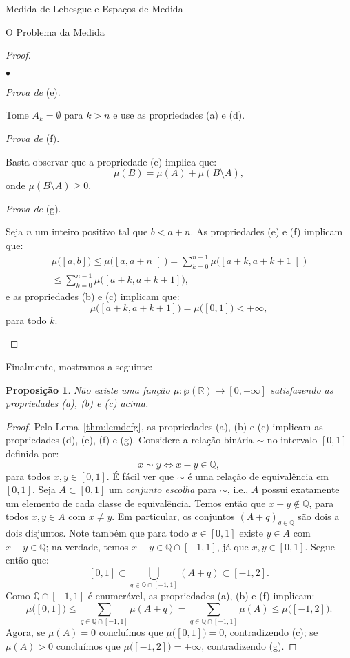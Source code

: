 \documentclass[oneside,final,11pt]{amsbook}
\newcommand{\R}{\mathds R}
\newcommand{\Q}{\mathds Q}
\newcounter{contador}
\newenvironment{bulletindent}{\setcounter{contador}{0}
\begin{list} {$\bullet$}
{\usecounter{contador}
\setlength{\leftmargin}{10pt}
\setlength{\rightmargin}{10pt}
\setlength{\labelsep}{5pt}
\setlength{\itemsep}{10pt}
\setlength{\topsep}{10pt}}}
{\end{list}}
\theoremstyle{remark}\newtheorem{exercise}{Exercício}[chapter]
\theoremstyle{remark}\newtheorem{*exercise}[exercise]{\hbox to 0pt{\hskip 0pt minus 1fil*}Exercício}
\theoremstyle{definition}\newtheorem{exdefin}{Definição}[chapter]
\theoremstyle{plain}\newtheorem{teo}{Teorema}[section]
\theoremstyle{plain}\newtheorem{lem}[teo]{Lema}
\theoremstyle{plain}\newtheorem{prop}[teo]{Proposição}
\theoremstyle{plain}\newtheorem{cor}[teo]{Corolário}
\theoremstyle{definition}\newtheorem{defin}[teo]{Definição}
\theoremstyle{remark}\newtheorem{rem}[teo]{Observação}
\theoremstyle{definition}\newtheorem{notation}[teo]{Notação}
\theoremstyle{definition}\newtheorem{convention}[teo]{Convenção}
\theoremstyle{definition}\newtheorem{example}[teo]{Exemplo}
\numberwithin{section}{chapter}
\numberwithin{equation}{section}
\begin{document}
\begin{chapter}{Medida de Lebesgue e Espaços de Medida}
\begin{section}{O Problema da Medida}
\begin{proof}
\begin{bulletindent}
\item {\em Prova de\/} (e).

Tome $A_k=\emptyset$ para $k>n$ e use as propriedades (a) e (d).

\item {\em Prova de\/} (f).

Basta observar que a propriedade (e) implica que:
\[\mu(B)=\mu(A)+\mu(B\setminus A),\]
onde $\mu(B\setminus A)\ge0$.

\item {\em Prova de\/} (g).

Seja $n$ um inteiro positivo tal que $b<a+n$. As propriedades
(e) e (f) implicam que:
\begin{multline*}
\mu\big([a,b]\big)\le\mu\big(\left[a,a+n\right[\big)=\sum_{k=0}^{n-1}\mu\big(\left[a+k,a+k+1\right[\big)\\
\le\sum_{k=0}^{n-1}\mu\big([a+k,a+k+1]\big),
\end{multline*}
e as propriedades (b) e (c) implicam que:
\[\mu\big([a+k,a+k+1]\big)=\mu\big([0,1]\big)<+\infty,\]
para todo $k$.\qedhere
\end{bulletindent}
\end{proof}

Finalmente, mostramos a seguinte:
\begin{prop}\label{thm:naoexistemu}
Não existe uma função $\mu:\wp(\R)\to[0,+\infty]$ satisfazendo as propriedades (a), (b)
e (c) acima.
\end{prop}
\begin{proof}
Pelo Lema~\ref{thm:lemdefg}, as propriedades (a), (b) e (c) implicam as propriedades
(d), (e), (f) e (g).
Considere a relação binária $\sim$ no intervalo $[0,1]$ definida por:
\[x\sim y\Longleftrightarrow x-y\in\Q,\]
para todos $x,y\in[0,1]$. É fácil ver que $\sim$ é uma relação de equivalência
em $[0,1]$.
Seja $A\subset[0,1]$ um {\em conjunto escolha\/}
para $\sim$, i.e., $A$ possui exatamente um
elemento de cada classe de equivalência. Temos então que $x-y\not\in\Q$, para todos $x,y\in A$
com $x\ne y$. Em particular, os conjuntos $(A+q)_{q\in\Q}$ são dois a dois disjuntos.
Note também que para todo $x\in[0,1]$ existe $y\in A$ com $x-y\in\Q$; na verdade, temos
$x-y\in\Q\cap[-1,1]$, já que $x,y\in[0,1]$. Segue então que:
\[[0,1]\subset\!\!\!\!\!\!\!\bigcup_{q\in\Q\cap[-1,1]}\!\!\!\!(A+q)\subset[-1,2].\]
Como $\Q\cap[-1,1]$ é enumerável, as propriedades (a), (b) e (f) implicam:
\[\mu\big([0,1]\big)\le\!\!\!\!\!\!\sum_{q\in\Q\cap[-1,1]}\!\!\!\mu(A+q)
=\!\!\!\!\!\!\sum_{q\in\Q\cap[-1,1]}\!\!\!\mu(A)\le\mu\big([-1,2]\big).\]
Agora, se $\mu(A)=0$ concluímos que $\mu\big([0,1]\big)=0$, contradizendo (c);
se $\mu(A)>0$ concluímos que $\mu\big([-1,2]\big)=+\infty$, contradizendo (g).
\end{proof}


\end{section}
\end{chapter}
\end{document}

